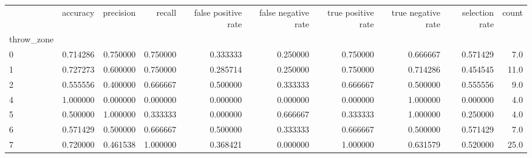 \begin{tabular}{lrrrrrrrrr}
\toprule
{} &  accuracy &  precision &    recall &  false positive rate &  false negative rate &  true positive rate &  true negative rate &  selection rate &  count \\
throw\_zone &           &            &           &                      &                      &                     &                     &                 &        \\
\midrule
0          &  0.714286 &   0.750000 &  0.750000 &             0.333333 &             0.250000 &            0.750000 &            0.666667 &        0.571429 &    7.0 \\
1          &  0.727273 &   0.600000 &  0.750000 &             0.285714 &             0.250000 &            0.750000 &            0.714286 &        0.454545 &   11.0 \\
2          &  0.555556 &   0.400000 &  0.666667 &             0.500000 &             0.333333 &            0.666667 &            0.500000 &        0.555556 &    9.0 \\
4          &  1.000000 &   0.000000 &  0.000000 &             0.000000 &             0.000000 &            0.000000 &            1.000000 &        0.000000 &    4.0 \\
5          &  0.500000 &   1.000000 &  0.333333 &             0.000000 &             0.666667 &            0.333333 &            1.000000 &        0.250000 &    4.0 \\
6          &  0.571429 &   0.500000 &  0.666667 &             0.500000 &             0.333333 &            0.666667 &            0.500000 &        0.571429 &    7.0 \\
7          &  0.720000 &   0.461538 &  1.000000 &             0.368421 &             0.000000 &            1.000000 &            0.631579 &        0.520000 &   25.0 \\
\bottomrule
\end{tabular}
